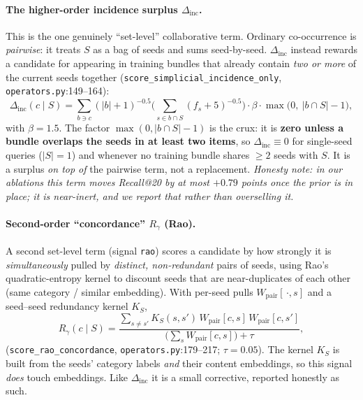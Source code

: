 \documentclass[11pt]{article}
\theoremstyle{remark}
\newcommand{\code}[1]{\texttt{\small #1}}
\begin{document}
\paragraph{The higher-order incidence surplus $\Delta_{\text{inc}}$.} This is the one genuinely ``set-level''
collaborative term. Ordinary co-occurrence is \emph{pairwise}: it treats $S$ as a bag of seeds and sums seed-by-seed.
$\Delta_{\text{inc}}$ instead rewards a candidate for appearing in training bundles that already contain \emph{two or
more} of the current seeds together (\code{score\_simplicial\_incidence\_only}, \code{operators.py}:149--164):
\[
  \Delta_{\text{inc}}(c\mid S)=\sum_{b\ni c}(|b|+1)^{-0.5}\Big(\sum_{s\in b\cap S}(f_s+5)^{-0.5}\Big)\cdot\beta\cdot\max\!\big(0,\ |b\cap S|-1\big),
\]
with $\beta=1.5$. The factor $\max(0,|b\cap S|-1)$ is the crux: it is \textbf{zero unless a bundle overlaps the
seeds in at least two items}, so $\Delta_{\text{inc}}\equiv 0$ for single-seed queries ($|S|=1$) and whenever no
training bundle shares $\ge 2$ seeds with $S$. It is a surplus \emph{on top of} the pairwise term, not a replacement.
\emph{Honesty note: in our ablations this term moves Recall@20 by at most $+0.79$ points once the prior is in place;
it is near-inert, and we report that rather than overselling it.}

\paragraph{Second-order ``concordance'' $R_\gamma$ (Rao).} A second set-level term (signal \code{rao}) scores a
candidate by how strongly it is \emph{simultaneously} pulled by \emph{distinct, non-redundant} pairs of seeds, using
Rao's quadratic-entropy kernel to discount seeds that are near-duplicates of each other (same category / similar
embedding). With per-seed pulls $W_{\text{pair}}[\,\cdot,s]$ and a seed--seed redundancy kernel $K_S$,
\[
  R_\gamma(c\mid S)=\frac{\sum_{s\ne s'}K_S(s,s')\,W_{\text{pair}}[c,s]\,W_{\text{pair}}[c,s']}{\big(\sum_s W_{\text{pair}}[c,s]\big)+\tau},
\]
(\code{score\_rao\_concordance}, \code{operators.py}:179--217; $\tau=0.05$). The kernel $K_S$ is built from the
seeds' category labels \emph{and} their content embeddings, so this signal \emph{does} touch embeddings. Like
$\Delta_{\text{inc}}$ it is a small corrective, reported honestly as such.
\end{document}
